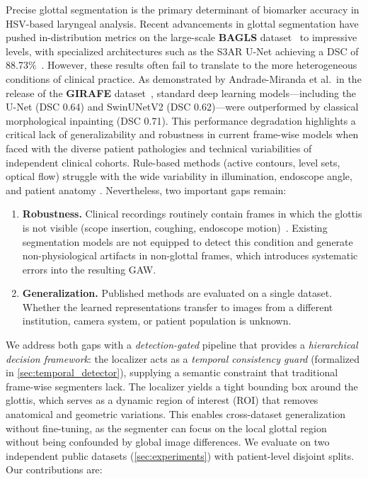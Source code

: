 \documentclass[preprint,12pt]{elsarticle}
\newcommand{\girafe}{\textbf{GIRAFE}}
\newcommand{\bagls}{\textbf{BAGLS}}
\newcommand{\gaw}{GAW}
\begin{document}
Precise glottal segmentation is the primary determinant of biomarker accuracy in HSV-based laryngeal analysis.
Recent advancements in glottal segmentation have pushed in-distribution
metrics on the large-scale \bagls{} dataset~\cite{gomez2020bagls} to impressive levels, with
specialized architectures such as the S3AR U-Net achieving a DSC of
\num{88.73}\%~\cite{montalbo2024}.
However, these results often fail to translate to the more heterogeneous
conditions of clinical practice.
As demonstrated by Andrade-Miranda et al.\ in the release of the \girafe{}
dataset~\cite{andrade2025datainbrief}, standard deep learning models---including
the U-Net (DSC \num{0.64}) and SwinUNetV2 (DSC \num{0.62})---were
outperformed by classical morphological inpainting (DSC \num{0.71}).
This performance degradation highlights a critical lack of generalizability
and robustness in current frame-wise models when faced with the diverse
patient pathologies and technical variabilities of independent clinical
cohorts.
Rule-based methods (active contours, level sets, optical flow) struggle with
the wide variability in illumination, endoscope angle, and patient anatomy
\cite{lohscheller2008laryngoscope}.
Nevertheless, two important gaps remain:

\begin{enumerate}
  \item \textbf{Robustness.}  Clinical recordings routinely contain frames in which
  the glottis is not visible (scope insertion, coughing, endoscope motion)~\cite{deliyski2008laryngoscope}.
  Existing segmentation models are not equipped to detect this
    condition and generate non-physiological artifacts in non-glottal frames,
    which introduces systematic errors into the resulting \gaw{}.

  \item \textbf{Generalization.}  Published methods are evaluated on a single
    dataset.  Whether the learned representations transfer to images from a
    different institution, camera system, or patient population is unknown.
\end{enumerate}

We address both gaps with a \emph{detection-gated} pipeline that provides a
\emph{hierarchical decision framework}: the localizer acts as a \emph{temporal
consistency guard} (formalized in \cref{sec:temporal_detector}), supplying a
semantic constraint that traditional frame-wise segmenters lack.
The localizer yields a tight bounding box around the glottis, which serves as
a dynamic region of interest (ROI) that removes anatomical and geometric variations.
This enables cross-dataset generalization without fine-tuning, as the segmenter can
focus on the local glottal region without being confounded by global image differences.
We evaluate on two independent public datasets (\cref{sec:experiments}) with
patient-level disjoint splits.
Our contributions are:
\end{document}
